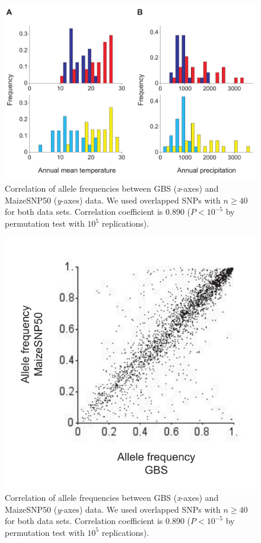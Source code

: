 \documentclass[onecolumn,oneside,letterpaper]{article}
\begin{document}
\renewcommand{\arraystretch}{1}

\begin{figure}[t]
  \begin{center}
    \includegraphics[width=0.6\columnwidth]{fig/bioclm.pdf}
    \caption{Correlation of allele frequencies between GBS (\emph{x}-axes) and MaizeSNP50 (\emph{y}-axes) data.  We used overlapped SNPs with $n\geq40$ for both data sets.  Correlation coefficient is 0.890 ($P<10^{-5}$ by permutation test with $10^5$ replications).}
    \label{colfreq}
  \end{center}
\end{figure}


\begin{figure}[t]
  \begin{center}
    \includegraphics[width=0.4\columnwidth]{fig/col.pdf}
    \caption{Correlation of allele frequencies between GBS (\emph{x}-axes) and MaizeSNP50 (\emph{y}-axes) data.  We used overlapped SNPs with $n\geq40$ for both data sets.  Correlation coefficient is 0.890 ($P<10^{-5}$ by permutation test with $10^5$ replications).}
    \label{colfreq}
  \end{center}
\end{figure}
\end{document}
